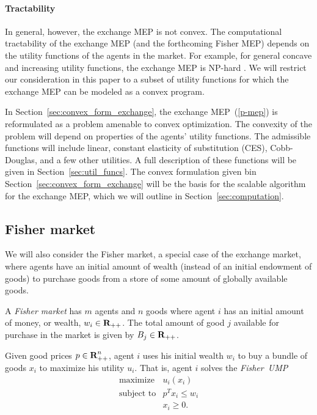 \documentclass[12pt]{article}
\begin{document}
\paragraph{Tractability}
In general, however, the exchange MEP is not convex.
The computational tractability of the exchange MEP
(and the forthcoming Fisher MEP) depends on the utility functions of
the agents in the market.
For example, for general concave and increasing utility functions,
the exchange MEP is NP-hard \cite{codenotti2006leontief}.
We will restrict our consideration in this paper to a subset of utility
functions for which the exchange MEP can be modeled as a convex program.

In Section~\ref{sec:convex_form_exchange}, the exchange MEP~(\ref{p-mep})
is reformulated as a problem amenable to convex optimization.
The convexity of the problem will depend on properties of the
agents' utility functions.
The admissible functions will include linear, constant elasticity
of substitution (CES), Cobb-Douglas, and a few other utilities.
A full description of these functions will be given in Section~\ref{sec:util_funcs}.
The convex formulation given bin Section~\ref{sec:convex_form_exchange} will
be the basis for the scalable algorithm for the exchange MEP, which
we will outline in Section~\ref{sec:computation}.


\subsection{Fisher market}
We will also consider the Fisher market, a special case of the exchange market, where agents have an initial amount of wealth (instead of an initial endowment of goods)
to purchase goods from a store of some amount of globally available goods.


A \emph{Fisher market} has $m$ agents and $n$ goods where
agent $i$ has an initial amount of money, or wealth, $w_i \in {\mbox{\bf R}}_{++}$.
The total amount of good $j$ available for purchase in the market is given by
$B_j \in {\mbox{\bf R}}_{++}$.

Given good prices $p \in {\mbox{\bf R}}^n_{++}$, agent $i$ uses his initial
wealth $w_i$ to buy a bundle of goods $x_i$ to maximize his utility $u_i$.
That is, agent $i$ solves the \emph{Fisher~UMP}
\begin{equation}
\label{p-fisher-ump}
\begin{array}{ll}
\mbox{maximize} & u_i(x_i) \\
\mbox{subject to} & p^T x_i \leq w_i \\
& x_i \geq 0.
\end{array}
\end{equation}
\end{document}
